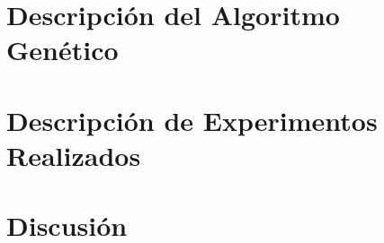\documentclass[a4paper,10pt]{article}
\begin{document}
\section{Descripción del Algoritmo Genético}

\section{Descripción de Experimentos Realizados}

\section{Discusión}
\end{document}
